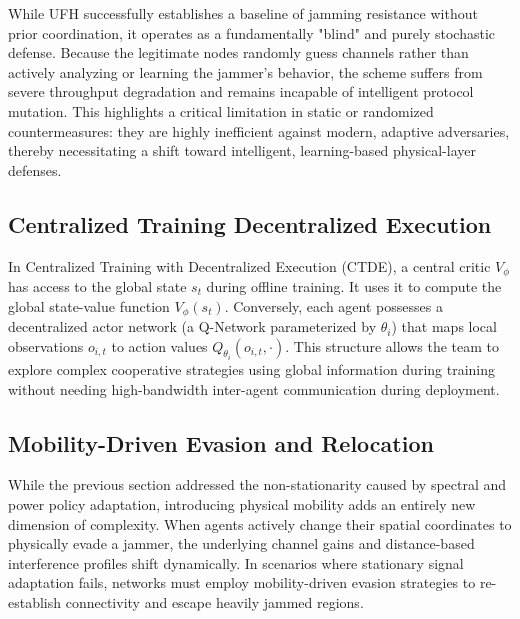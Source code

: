 \documentclass[journal]{IEEEtran}
\newcommand{\adm}[1]{{\color{orange}{[#1]}}}
\newcommand{\rar}[1]{{\color{blue}{[#1]}}}
\begin{document}
While UFH successfully establishes a baseline of jamming resistance without prior coordination, it operates as a fundamentally "blind" and purely stochastic defense.
Because the legitimate nodes randomly guess channels rather than actively analyzing or learning the jammer’s behavior, the scheme suffers from severe throughput degradation and remains incapable of intelligent protocol mutation.
This highlights a critical limitation in static or randomized countermeasures: they are highly inefficient against modern, adaptive adversaries, thereby necessitating a shift toward intelligent, learning-based physical-layer defenses.
\rar{More of anti-jamming, maybe interesting as baseline but not relevant to proposed method}

\subsection{Centralized Training Decentralized Execution } \rar{probably get rid of}
In Centralized Training with Decentralized Execution (CTDE), a central critic $V_{\phi}$ has access to the global state $s_t$ during offline training. 
It uses it to compute the global state-value function $V_{\phi}(s_t)$. 
Conversely, each agent possesses a decentralized actor network (a Q-Network parameterized by $\theta_i$) that maps local observations $o_{i,t}$ to action values $Q_{\theta_i}(o_{i,t},\cdot)$. 
This structure allows the team to explore complex cooperative strategies using global information during training without needing high-bandwidth inter-agent communication during deployment. 

\subsection{Mobility-Driven Evasion and Relocation}
While the previous section addressed the non-stationarity caused by spectral and power policy adaptation, introducing physical mobility adds an entirely new dimension of complexity.
When agents actively change their spatial coordinates to physically evade a jammer, the underlying channel gains and distance-based interference profiles shift dynamically.
In scenarios where stationary signal adaptation fails, networks must employ mobility-driven evasion strategies to re-establish connectivity and escape heavily jammed regions.
\adm{can look at https://ieeexplore.ieee.org/abstract/document/11302544/. it is related because it's cooperative marl for countering jamming, but it's not that related because they're not looking into PHY regulation from either attacker or defenders. the final length of RW section should be around 1 or 1.5 columns (plus a RW table) so we should select those works that are closely relevant to what you propose. This one https://ieeexplore.ieee.org/document/10547296 tries to consider both aspects: what are limitations that can be fixed? In both scenarios it is assumes that mobile nodes's trajectories can be controlled, but it is often not the case (e.g., network of smartphones)}
\end{document}
